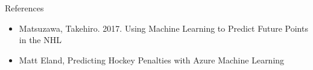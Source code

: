 \begin{frame}{References}
    \begin{itemize}
       \item Matsuzawa, Takehiro. 2017. Using Machine Learning to Predict Future Points in the NHL
       \item Matt Eland, Predicting Hockey Penalties with Azure Machine Learning
    \end{itemize}
\end{frame}  
